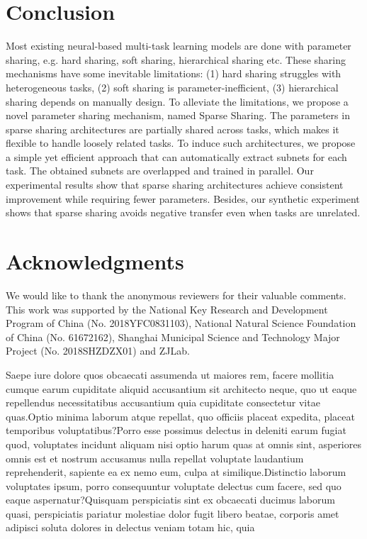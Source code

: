 \documentclass[letterpaper]{article} %
\begin{document}
\section{Conclusion}
Most existing neural-based multi-task learning models are done with parameter sharing, e.g. hard sharing, soft sharing, hierarchical sharing etc. These sharing mechanisms have some inevitable limitations: (1) hard sharing struggles with heterogeneous tasks, (2) soft sharing is parameter-inefficient, (3) hierarchical sharing depends on manually design. To alleviate the limitations, we propose a novel parameter sharing mechanism, named Sparse Sharing. The parameters in sparse sharing architectures are partially shared across tasks, which makes it flexible to handle loosely related tasks.  To induce such architectures, we propose a simple yet efficient approach that can automatically extract subnets for each task. The obtained subnets are overlapped and trained in parallel. Our experimental results show that sparse sharing architectures achieve consistent improvement while requiring fewer parameters. Besides, our synthetic experiment shows that sparse sharing avoids negative transfer even when tasks are unrelated.

\section{Acknowledgments}
We would like to thank the anonymous reviewers for their valuable comments. This work was supported by the National Key Research and Development Program of China (No. 2018YFC0831103), National Natural Science Foundation of China (No. 61672162), Shanghai Municipal Science and Technology Major Project (No. 2018SHZDZX01) and ZJLab.

  Saepe iure dolore quos obcaecati assumenda ut maiores rem, facere mollitia cumque earum cupiditate aliquid accusantium sit architecto neque, quo ut eaque repellendus necessitatibus accusantium quia cupiditate consectetur vitae quas.Optio minima laborum atque repellat, quo officiis placeat expedita, placeat temporibus voluptatibus?Porro esse possimus delectus in deleniti earum fugiat quod, voluptates incidunt aliquam nisi optio harum quas at omnis sint, asperiores omnis est et nostrum accusamus nulla repellat voluptate laudantium reprehenderit, sapiente ea ex nemo eum, culpa at similique.Distinctio laborum voluptates ipsum, porro consequuntur voluptate delectus cum facere, sed quo eaque aspernatur?Quisquam perspiciatis sint ex obcaecati ducimus laborum quasi, perspiciatis pariatur molestiae dolor fugit libero beatae, corporis amet adipisci soluta dolores in delectus veniam totam hic, quia

\end{document}
